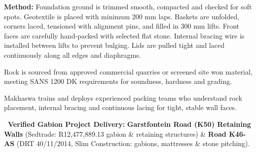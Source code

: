 \vspace{0.14cm}

\noindent
\begin{tcolorbox}[enhanced, colback=mhoffwhite, colframe=mhlightgray, boxrule=0.7pt, arc=4pt, left=8pt, right=8pt, top=6pt, bottom=6pt, borderline west={3pt}{0pt}{mhgold}, drop shadow=black!3]
    {\fontsize{7.8pt}{10.2pt}\selectfont\color{mhtext}
    \textbf{Method:} Foundation ground is trimmed smooth, compacted and checked for soft spots. Geotextile is placed with minimum 200 mm laps. Baskets are unfolded, corners laced, tensioned with alignment pins, and filled in 300 mm lifts. Front faces are carefully hand-packed with selected flat stone. Internal bracing wire is installed between lifts to prevent bulging. Lids are pulled tight and laced continuously along all edges and diaphragms.
    }
\end{tcolorbox}

\vfill

\noindent
\begin{minipage}[t]{0.485\textwidth}
    \begin{tcolorbox}[enhanced, colback=white, colframe=mhlightgray, boxrule=0.8pt, arc=4pt, title={\bfseries\color{white}\faTruckMonster\ Rock Logistics \& Supply}, colbacktitle=mhnavy, left=7pt, right=7pt, top=6pt, bottom=6pt, drop shadow=black!3]
        {\fontsize{7.8pt}{10.4pt}\selectfont\color{mhtext}
        Rock is sourced from approved commercial quarries or screened site won material, meeting SANS 1200 DK requirements for soundness, hardness and grading.
        }
    \end{tcolorbox}
\end{minipage}
\hfill
\begin{minipage}[t]{0.485\textwidth}
    \begin{tcolorbox}[enhanced, colback=white, colframe=mhlightgray, boxrule=0.8pt, arc=4pt, title={\bfseries\color{white}\faUsers\ Skilled Hand-Packing Labour}, colbacktitle=mhblue, left=7pt, right=7pt, top=6pt, bottom=6pt, drop shadow=black!3]
        {\fontsize{7.8pt}{10.4pt}\selectfont\color{mhtext}
        Makhaswa trains and deploys experienced packing teams who understand rock placement, internal bracing and continuous lacing for tight, stable wall faces.
        }
    \end{tcolorbox}
\end{minipage}

\vfill

\noindent
\begin{tcolorbox}[enhanced, colback=white, colframe=mhnavy, boxrule=0.8pt, arc=3pt, left=8pt, right=8pt, top=6pt, bottom=6pt, drop shadow=black!3]
    {\fontsize{8pt}{10.6pt}\selectfont\color{mhnavy}\bfseries\faCheckCircle\ Verified Gabion Project Delivery:}\quad
    {\fontsize{8pt}{10.6pt}\selectfont\color{mhtext}
    \textbf{Garstfontein Road (K50) Retaining Walls} (Sedtrade: R12,477,889.13 gabion \& retaining structures) \& \textbf{Road K46-AS} (DRT 40/11/2014, Slim Construction: gabions, mattresses \& stone pitching).
    }
\end{tcolorbox}

\clearpage
